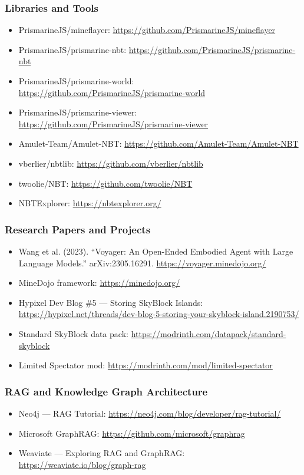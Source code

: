 \documentclass[11pt,letterpaper]{article}
\begin{document}
\subsubsection*{Libraries and Tools}
\begin{itemize}[leftmargin=2em]
\item PrismarineJS/mineflayer: \url{https://github.com/PrismarineJS/mineflayer}
\item PrismarineJS/prismarine-nbt: \url{https://github.com/PrismarineJS/prismarine-nbt}
\item PrismarineJS/prismarine-world: \url{https://github.com/PrismarineJS/prismarine-world}
\item PrismarineJS/prismarine-viewer: \url{https://github.com/PrismarineJS/prismarine-viewer}
\item Amulet-Team/Amulet-NBT: \url{https://github.com/Amulet-Team/Amulet-NBT}
\item vberlier/nbtlib: \url{https://github.com/vberlier/nbtlib}
\item twoolie/NBT: \url{https://github.com/twoolie/NBT}
\item NBTExplorer: \url{https://nbtexplorer.org/}
\end{itemize}

\subsubsection*{Research Papers and Projects}
\begin{itemize}[leftmargin=2em]
\item Wang et al. (2023). ``Voyager: An Open-Ended Embodied Agent with Large Language Models.'' arXiv:2305.16291. \url{https://voyager.minedojo.org/}
\item MineDojo framework: \url{https://minedojo.org/}
\item Hypixel Dev Blog \#5 --- Storing SkyBlock Islands: \url{https://hypixel.net/threads/dev-blog-5-storing-your-skyblock-island.2190753/}
\item Standard SkyBlock data pack: \url{https://modrinth.com/datapack/standard-skyblock}
\item Limited Spectator mod: \url{https://modrinth.com/mod/limited-spectator}
\end{itemize}

\subsubsection*{RAG and Knowledge Graph Architecture}
\begin{itemize}[leftmargin=2em]
\item Neo4j --- RAG Tutorial: \url{https://neo4j.com/blog/developer/rag-tutorial/}
\item Microsoft GraphRAG: \url{https://github.com/microsoft/graphrag}
\item Weaviate --- Exploring RAG and GraphRAG: \url{https://weaviate.io/blog/graph-rag}
\end{itemize}
\end{document}
